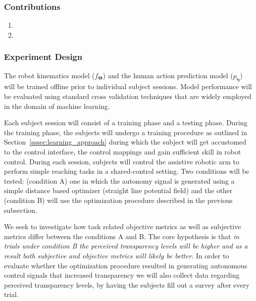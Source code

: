 \documentclass[12pt]{article}
\begin{document}
\subsubsection{Contributions}
\begin{enumerate}
	\item {}
	\item {}
\end{enumerate}

\subsubsection{Experiment Design}

The robot kinematics model ($f_{\boldsymbol{\Theta}}$) and the human action prediction model ($p_{\boldsymbol{\eta}}$) will be trained offline prior to individual subject sessions. Model performance will be evaluated using standard cross validation techniques that are widely employed in the domain of machine learning. 

Each subject session will consist of a training phase and a testing phase. During the training phase, the subjects will undergo a training procedure as outlined in Section~\ref{sssec:learning_approach} during which the subject will get accustomed to the control interface, the control mappings and gain sufficient skill in robot control. 
During each session, subjects will control the assistive robotic arm to perform simple reaching tasks in a shared-control setting. Two conditions will be tested: (condition A) one in which the autonomy signal is generated using a simple distance based optimizer (straight line potential field) and the other (condition B) will use the optimization procedure described in the previous subsection. 

We seek to investigate how task related objective metrics as well as subjective metrics differ between the conditions A and B. The core hypothesis is that \textit{in trials under condition B the perceived transparency levels will be higher and as a result both subjective and objective metrics will likely be better. } In order to evaluate whether the optimization procedure resulted in generating autonomous control signals that increased transparency we will also collect data regarding perceived transparency levels, by having the subjects fill out a survey after every trial.
\end{document}
